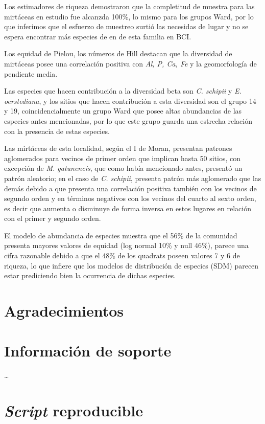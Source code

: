 \documentclass[11pt,]{article}
\begin{document}
Los estimadores de riqueza demostraron que la completitud de muestra
para las mirtáceas en estudio fue alcanzda 100\%, lo mismo para los
grupos Ward, por lo que inferimos que el esfuerzo de muestreo surtió las
necesidas de lugar y no se espera encontrar más especies de en de esta
familia en BCI.

Los equidad de Pielou, los números de Hill destacan que la diversidad de
mirtáceas posee una correlación positiva con \emph{Al, P, Ca, Fe} y la
geomorfología de pendiente media.

Las especies que hacen contribución a la diversidad beta son \emph{C.
schipii} y \emph{E. oerstediana}, y los sitios que hacen contribución a
esta diversidad son el grupo 14 y 19, coincidencialmente un grupo Ward
que posee altas abundancias de las especies antes mencionadas, por lo
que este grupo guarda una estrecha relación con la presencia de estas
especies.

Las mirtáceas de esta localidad, según el I de Moran, presentan patrones
aglomerados para vecinos de primer orden que implican hasta 50 sitios,
con excepción de \emph{M. gatunencis}, que como había mencionado antes,
presentó un patrón aleatorio; en el caso de \emph{C. schipii}, presenta
patrón más aglomerado que las demás debido a que presenta una
correlación positiva también con los vecinos de segundo orden y en
términos negativos con los vecinos del cuarto al sexto orden, es decir
que aumenta o disminuye de forma inversa en estos lugares en relación
con el primer y segundo orden.

El modelo de abundancia de especies muestra que el 56\% de la comunidad
presenta mayores valores de equidad (log normal 10\% y null 46\%),
parece una cifra razonable debido a que el 48\% de los quadrats poseen
valores 7 y 6 de riqueza, lo que infiere que los modelos de distribución
de especies (SDM) parecen estar prediciendo bien la ocurrencia de dichas
especies.

\section{Agradecimientos}\label{agradecimientos}

\section{Información de soporte}\label{informaciuxf3n-de-soporte}

\ldots

\section{\texorpdfstring{\emph{Script}
reproducible}{Script reproducible}}\label{script-reproducible}
\end{document}
